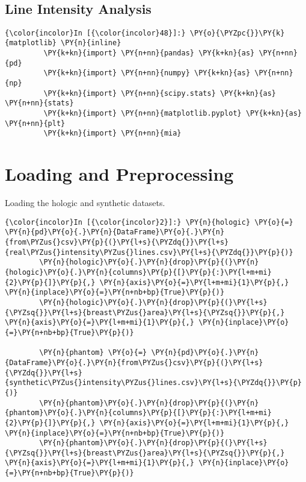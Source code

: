     \begin{center}
    \end{center}
    { \hspace*{\fill} \\}

    
\subsection*{Line Intensity Analysis}


    \begin{Verbatim}[commandchars=\\\{\}]
{\color{incolor}In [{\color{incolor}48}]:} \PY{o}{\PYZpc{}}\PY{k}{matplotlib} \PY{n}{inline}
         \PY{k+kn}{import} \PY{n+nn}{pandas} \PY{k+kn}{as} \PY{n+nn}{pd}
         \PY{k+kn}{import} \PY{n+nn}{numpy} \PY{k+kn}{as} \PY{n+nn}{np}
         \PY{k+kn}{import} \PY{n+nn}{scipy.stats} \PY{k+kn}{as} \PY{n+nn}{stats}
         \PY{k+kn}{import} \PY{n+nn}{matplotlib.pyplot} \PY{k+kn}{as} \PY{n+nn}{plt}
         \PY{k+kn}{import} \PY{n+nn}{mia}
\end{Verbatim}

    \section{Loading and Preprocessing}\label{loading-and-preprocessing}

    Loading the hologic and synthetic datasets.

    \begin{Verbatim}[commandchars=\\\{\}]
{\color{incolor}In [{\color{incolor}2}]:} \PY{n}{hologic} \PY{o}{=} \PY{n}{pd}\PY{o}{.}\PY{n}{DataFrame}\PY{o}{.}\PY{n}{from\PYZus{}csv}\PY{p}{(}\PY{l+s}{\PYZdq{}}\PY{l+s}{real\PYZus{}intensity\PYZus{}lines.csv}\PY{l+s}{\PYZdq{}}\PY{p}{)}
        \PY{n}{hologic}\PY{o}{.}\PY{n}{drop}\PY{p}{(}\PY{n}{hologic}\PY{o}{.}\PY{n}{columns}\PY{p}{[}\PY{p}{:}\PY{l+m+mi}{2}\PY{p}{]}\PY{p}{,} \PY{n}{axis}\PY{o}{=}\PY{l+m+mi}{1}\PY{p}{,} \PY{n}{inplace}\PY{o}{=}\PY{n+nb+bp}{True}\PY{p}{)}
        \PY{n}{hologic}\PY{o}{.}\PY{n}{drop}\PY{p}{(}\PY{l+s}{\PYZsq{}}\PY{l+s}{breast\PYZus{}area}\PY{l+s}{\PYZsq{}}\PY{p}{,} \PY{n}{axis}\PY{o}{=}\PY{l+m+mi}{1}\PY{p}{,} \PY{n}{inplace}\PY{o}{=}\PY{n+nb+bp}{True}\PY{p}{)}

        \PY{n}{phantom} \PY{o}{=} \PY{n}{pd}\PY{o}{.}\PY{n}{DataFrame}\PY{o}{.}\PY{n}{from\PYZus{}csv}\PY{p}{(}\PY{l+s}{\PYZdq{}}\PY{l+s}{synthetic\PYZus{}intensity\PYZus{}lines.csv}\PY{l+s}{\PYZdq{}}\PY{p}{)}
        \PY{n}{phantom}\PY{o}{.}\PY{n}{drop}\PY{p}{(}\PY{n}{phantom}\PY{o}{.}\PY{n}{columns}\PY{p}{[}\PY{p}{:}\PY{l+m+mi}{2}\PY{p}{]}\PY{p}{,} \PY{n}{axis}\PY{o}{=}\PY{l+m+mi}{1}\PY{p}{,} \PY{n}{inplace}\PY{o}{=}\PY{n+nb+bp}{True}\PY{p}{)}
        \PY{n}{phantom}\PY{o}{.}\PY{n}{drop}\PY{p}{(}\PY{l+s}{\PYZsq{}}\PY{l+s}{breast\PYZus{}area}\PY{l+s}{\PYZsq{}}\PY{p}{,} \PY{n}{axis}\PY{o}{=}\PY{l+m+mi}{1}\PY{p}{,} \PY{n}{inplace}\PY{o}{=}\PY{n+nb+bp}{True}\PY{p}{)}
\end{Verbatim}

